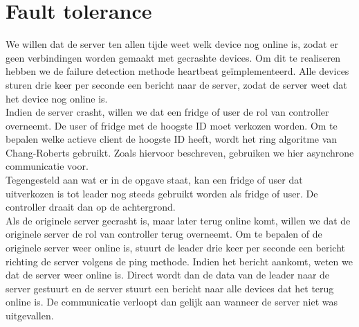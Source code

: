 \documentclass[a4paper]{article}
\begin{document}
	\section{Fault tolerance}
		We willen dat de server ten allen tijde weet welk device nog online is, zodat er geen verbindingen worden gemaakt met gecrashte devices. Om dit te realiseren hebben we de failure detection methode heartbeat ge\"implementeerd. Alle devices sturen drie keer per seconde een bericht naar de server, zodat de server weet dat het device nog online is. \\
		Indien de server crasht, willen we dat een fridge of user de rol van controller overneemt. De user of fridge met de hoogste ID moet verkozen worden. Om te bepalen welke actieve client de hoogste ID heeft, wordt het ring algoritme van Chang-Roberts gebruikt. Zoals hiervoor beschreven, gebruiken we hier asynchrone communicatie voor. \\
		Tegengesteld aan wat er in de opgave staat, kan een fridge of user dat uitverkozen is tot leader nog steeds gebruikt worden als fridge of user. De controller draait dan op de achtergrond. \\
		Als de originele server gecrasht is, maar later terug online komt, willen we dat de originele server de rol van controller terug overneemt. Om te bepalen of de originele server weer online is, stuurt de leader drie keer per seconde een bericht richting de server volgens de ping methode. Indien het bericht aankomt, weten we dat de server weer online is. Direct wordt dan de data van de leader naar de server gestuurt en de server stuurt een bericht naar alle devices dat het terug online is. De communicatie verloopt dan gelijk aan wanneer de server niet was uitgevallen.
		
\end{document}
